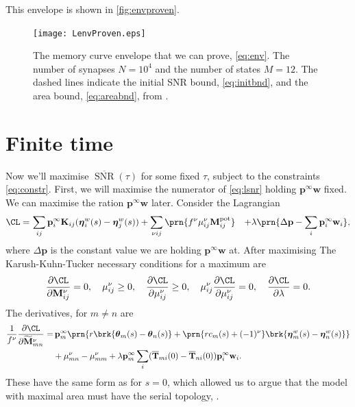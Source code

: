 \documentclass[12pt]{article}
\newcommand{\pr}{\mathbf{p}}
\newcommand{\eq}{\pr^\infty}
\newcommand{\fpt}{\mathbf{T}}
\newcommand{\fptb}{\overline{\fpt}}
\newcommand{\etw}{\boldsymbol{\eta}^w}
\newcommand{\thb}{\boldsymbol{\theta}}
\newcommand{\w}{\mathbf{w}}
\newcommand{\M}{\mathbf{M}}
\newcommand{\enc}{\mathbf{K}}
\newcommand{\pot}{^{\text{pot}}}
\newcommand{\Mh}{\widetilde{\M}}
\DeclareMathOperator{\snr}{SNR}
\newcommand{\snrb}{\overline{\snr}}
\renewcommand{\pdiff}[2]{\frac{\partial #1}{\partial #2}}
\begin{document}
This envelope is shown in \autoref{fig:envproven}.


\begin{figure}[tb]
  \centering
  \texttt{[image: LenvProven.eps]}
  \caption[Proven envelope for the signal-to-noise ratio]
  {The memory curve envelope that we can prove, \eqref{eq:env}.
  The number of synapses $N=10^4$ and the number of states $M=12$.
  The dashed lines indicate the initial SNR bound, \eqref{eq:initbnd}, and the area bound, \eqref{eq:areabnd}, from \cite{Lahiri2013synapse}.}\label{fig:envproven}
\end{figure}




\section{Finite time}\label{sec:finite}

Now we'll maximise $\snrb(\tau)$ for some fixed $\tau$, subject to the constraints \eqref{eq:constr}.
First, we will maximise the numerator of \eqref{eq:lsnr} holding $\eq\w$ fixed.
We can maximise the ration \wrt $\eq\w$ later.
Consider the Lagrangian
%
\begin{equation}\label{eq:finitelagrangian}
\begin{aligned}
  \CL =&\, \sum_{ij} \eq_i \enc_{ij} (\etw_i(s) - \etw_j(s))
        +\sum_{\nu i j} \prn{ f^\nu \mu^\nu_{ij} \M\pot_{ij} }
        &+ \lambda \prn{ \Delta\pr - \sum_i \eq_i\w_i },
\end{aligned}
\end{equation}
%
where $\Delta\pr$ is the constant value we are holding $\eq\w$ at.
After maximising
The Karush-Kuhn-Tucker necessary conditions for a maximum are
%
\begin{equation}\label{eq:KTfinite}
  \pdiff{\CL}{\M^\nu_{ij}} = 0, \quad
  \mu^\nu_{ij} \geq 0, \quad
  \pdiff{\CL}{\mu^\nu_{ij}} \geq 0, \quad
  \mu^\nu_{ij}\pdiff{\CL}{\mu^\nu_{ij}} = 0, \quad
  \pdiff{\CL}{\lambda} = 0.
\end{equation}
%
The derivatives, for $m \neq n$ are
%
\begin{equation}\label{eq:finitederivs}
\begin{aligned}
  \frac{1}{f^\nu} \pdiff{\CL}{\Mh^\nu_{mn}} = & \,
      \eq_m \prn{ r \brk{\thb_m(s) - \thb_n(s)}
     +\prn{rc_m(s) + (-1)^\nu} \brk{\etw_m(s) - \etw_n(s)} } \\
     &+ \mu^\nu_{mn} -  \mu^\nu_{mm}
     + \lambda \eq_m \sum_i (\fptb_{mi}(0)-\fptb_{ni}(0)) \eq_i\w_i.
\end{aligned}
\end{equation}
%
These have the same form as for $s=0$, which allowed us to argue that the model with maximal area must have the serial topology, \cite{Leibold2008serial,Ben-DayanRubin2007sparse}.
\end{document}
